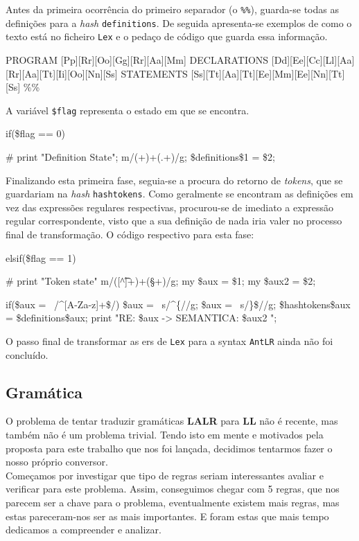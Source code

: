 \documentclass[11pt,a4paper]{article}
\begin{document}
Antes da primeira ocorrência do primeiro separador (o \texttt{\%\%}), guarda-se todas as definições para a \emph{hash} \texttt{definitions}. De seguida apresenta-se exemplos de 
como o texto está no ficheiro \texttt{Lex} e o pedaço de código que guarda essa informação.\\

\begin{code_txt}
PROGRAM         [Pp][Rr][Oo][Gg][Rr][Aa][Mm]
DECLARATIONS    [Dd][Ee][Cc][Ll][Aa][Rr][Aa][Tt][Ii][Oo][Nn][Ss]
STATEMENTS      [Ss][Tt][Aa][Tt][Ee][Mm][Ee][Nn][Tt][Ss]
\%\%
\end{code_txt}

A variável \texttt{\$flag} representa o estado em que se encontra.\\

\begin{code_c}
        if(\$flag == 0){
        \#       print "Definition State\n";
                m/(\w+)\s+(.+)/g;
                \$definitions{\$1} = \$2;

        }
\end{code_c}

Finalizando esta primeira fase, seguia-se a procura do retorno de \emph{tokens}, que se guardariam na \emph{hash} \texttt{hashtokens}. Como geralmente se encontram as definições
em vez das expressões regulares respectivas, procurou-se de imediato a expressão regular correspondente, visto que a sua definição de nada iria valer no processo final de transformação.
O código respectivo para esta fase:\\

\begin{code_c}
        elsif(\$flag == 1){
        \#       print "Token state\n"
                m/([^\t\n]+)\s+(\S+)/g;
                my \$aux = \$1;
                my \$aux2 = \$2; 

                if(\$aux =~ /^{[A-Za-z]+}\$/){
                        \$aux =~ s/^\{//g;
                        \$aux =~ s/\}\$//g;
                        \$hashtokens{\$aux} = \$definitions{\$aux};
                }
                print "RE: \$aux -> SEMANTICA: \$aux2 \n";
        }
\end{code_c}

O passo final de transformar as ers de \texttt{Lex} para a syntax \texttt{AntLR} ainda não foi concluído.

\subsection{Gramática}
O problema de tentar traduzir gramáticas \textbf{LALR} para \textbf{LL} não é recente, mas também não é um problema trivial. Tendo isto em mente e motivados pela proposta
para este trabalho que nos foi lançada, decidimos tentarmos fazer o nosso próprio conversor.\\
Começamos por investigar que tipo de regras seriam interessantes avaliar e verificar para este problema. Assim, conseguimos chegar com 5 regras, que nos parecem ser a chave
para o problema, eventualmente existem mais regras, mas estas pareceram-nos ser as mais importantes. E foram estas que mais tempo dedicamos a compreender e analizar.
\end{document}

